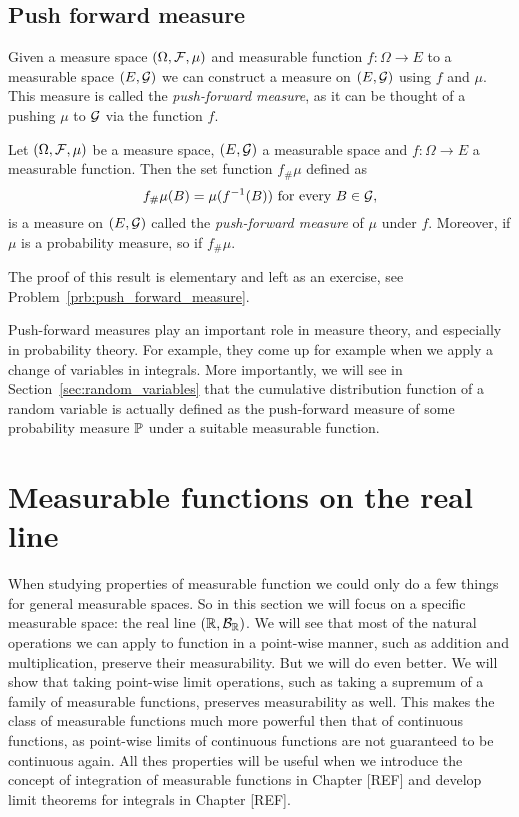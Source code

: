\subsection{Push forward measure}

Given a measure space $(\Omega, \mathcal F, \mu)$ and measurable function $f : \Omega \to E$ to a measurable space $(E,\mathcal G)$ we can construct a measure on $(E,\mathcal G)$ using $f$ and $\mu$. This measure is called the \emph{push-forward measure}, as it can be thought of a pushing $\mu$ to $\mathcal G$ via the function $f$.

\begin{proposition}\label{prop:push_forward_measure}
Let $(\Omega, \mathcal F, \mu)$ be a measure space, $(E, \mathcal G)$ a measurable space and $f : \Omega \to E$ a measurable function. Then the set function $f_\# \mu$ defined as
\[
	f_\# \mu (B) = \mu(f^{-1}(B)) \text{ for every } B \in \mathcal G,
\]
is a measure on $(E, \mathcal G)$ called the \emph{push-forward measure} of $\mu$ under $f$. Moreover, if $\mu$ is a probability measure, so if $f_\# \mu$.
\end{proposition}

The proof of this result is elementary and left as an exercise, see Problem~\ref{prb:push_forward_measure}. 

Push-forward measures play an important role in measure theory, and especially in probability theory. For example, they come up for example when we apply a change of variables in integrals. More importantly, we will see in Section~\ref{sec:random_variables} that the cumulative distribution function of a random variable is actually defined as the push-forward measure of some probability measure $\mathbb P$ under a suitable measurable function.

\section{Measurable functions on the real line}\label{sec:measurable_functions_real_line}

When studying properties of measurable function we could only do a few things for general measurable spaces. So in this section we will focus on a specific measurable space: the real line $(\mathbb R, \mathcal B_{\mathbb R})$. We will see that most of the natural operations we can apply to function in a point-wise manner, such as addition and multiplication, preserve their measurability. But we will do even better. We will show that taking point-wise limit operations, such as taking a supremum of a family of measurable functions, preserves measurability as well. This makes the class of measurable functions much more powerful then that of continuous functions, as point-wise limits of continuous functions are not guaranteed to be continuous again. All thes properties will be useful when we introduce the concept of integration of measurable functions in Chapter [REF] and develop limit theorems for integrals in Chapter [REF].

